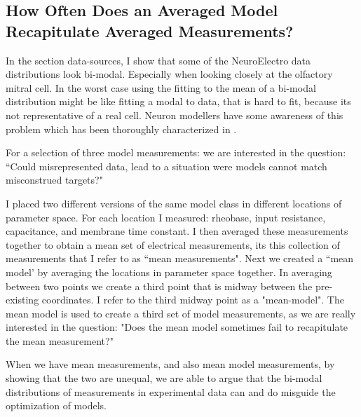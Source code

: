 \subsection{How Often Does an Averaged Model Recapitulate Averaged Measurements?}
In the section data-sources, I show that some of the NeuroElectro data distributions look bi-modal. Especially when looking closely at the olfactory mitral cell. In the worst case using the fitting to the mean of a bi-modal distribution might be like fitting a modal to data, that is hard to fit, because its not representative of a real cell. Neuron modellers have some awareness of this problem which has been thoroughly characterized in \cite{marder2011multiple}.

For a selection of three model measurements: we are interested in the question: ``Could misrepresented data, lead to a situation were models cannot match  misconstrued targets?" %

I placed two different versions of the same  model class in different locations of parameter space. For each location I measured: rheobase, input resistance, capacitance, and membrane time constant.
I then averaged these measurements together to obtain a mean set of electrical measurements, its this collection of measurements that I refer to as ``mean measurements". Next we created a ``mean model' by averaging the locations in parameter space together.
In averaging between two points we create a third point that is midway between the pre-existing coordinates. I refer to the third midway point as a "mean-model".
The mean model is used to create a third set of model measurements, as we are really interested in the question: "Does the mean model sometimes fail to recapitulate the mean measurement?"


When we have mean measurements, and also mean model measurements, by showing that the two are unequal, we are able to argue that the bi-modal distributions of measurements in experimental data can and do misguide the  optimization of models.

